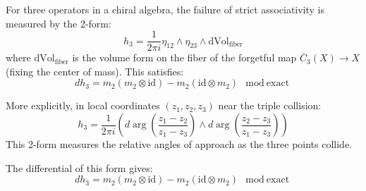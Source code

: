 \begin{proposition}\label{prop:assoc-homotopy}
For three operators in a chiral algebra, the failure of strict associativity is measured by the 2-form:
\[
h_3 = \frac{1}{2\pi i} \eta_{12} \wedge \eta_{23} \wedge \text{dVol}_{\text{fiber}}
\]
where $\text{dVol}_{\text{fiber}}$ is the volume form on the fiber of the forgetful map 
$\overline{C}_3(X) \to X$ (fixing the center of mass). This satisfies:
\[
dh_3 = m_2(m_2 \otimes \text{id}) - m_2(\text{id} \otimes m_2) \mod \text{exact}
\]

More explicitly, in local coordinates $(z_1, z_2, z_3)$ near the triple collision:
\[
h_3 = \frac{1}{2\pi i} \left( d\arg\left(\frac{z_1 - z_2}{z_1 - z_3}\right) \wedge d\arg\left(\frac{z_2 - z_3}{z_1 - z_3}\right) \right)
\]
This 2-form measures the relative angles of approach as the three points collide.

The differential of this form gives:
\[
dh_3 = m_2(m_2 \otimes \text{id}) - m_2(\text{id} \otimes m_2) \mod \text{exact}
\]
\end{proposition}
 
